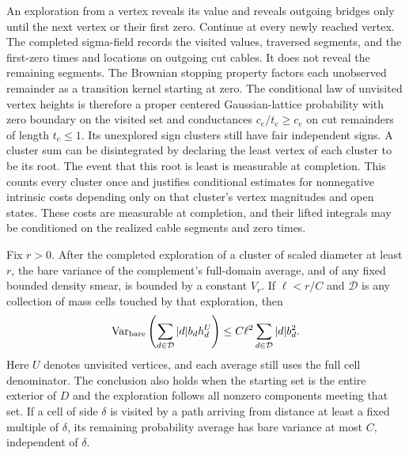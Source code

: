 An exploration from a vertex reveals its value and reveals outgoing
bridges only until the next vertex or their first zero.  Continue at
every newly reached vertex.  The completed sigma-field records the
visited values, traversed segments, and the first-zero times and
locations on outgoing cut cables.  It does not reveal the remaining
segments.  The Brownian stopping property factors each unobserved
remainder as a transition kernel starting at zero.  The conditional
law of unvisited vertex heights is therefore a proper centered
Gaussian-lattice probability with zero boundary on the visited set
and conductances $c_e/t_e\ge c_e$ on cut remainders of length
$t_e\le1$.  Its unexplored sign clusters still have fair independent
signs.  A cluster sum can be disintegrated by declaring the least
vertex of each cluster to be its root.  The event that this root is
least is measurable at completion.  This counts every cluster once
and justifies conditional estimates for nonnegative intrinsic costs
depending only on that cluster's vertex magnitudes and open states.
These costs are measurable at completion, and their lifted integrals
may be conditioned on the realized cable segments and zero times.

\begin{lemma}\label{an:path-poincare}
Fix $r>0$.  After the completed exploration of a cluster of scaled
diameter at least $r$, the bare variance of the complement's
full-domain average, and of any fixed bounded density smear, is
bounded by a constant $V_r$.  If $\ell<r/C$ and $\mathcal D$ is any
collection of mass cells touched by that exploration, then
\begin{equation}
 \operatorname{Var}_{\mathrm{bare}}\left(
       \sum_{d\in\mathcal D}|d|b_d h_d^U\right)
    \le C\ell^2\sum_{d\in\mathcal D}|d|b_d^2.
 \label{an:local-path-bound}
\end{equation}
Here $U$ denotes unvisited vertices, and each average still uses the
full cell denominator.  The conclusion also holds when the starting
set is the entire exterior of $D$ and the exploration follows all
nonzero components meeting that set.  If a cell of side $\delta$ is
visited by a path arriving from distance at least a fixed multiple
of $\delta$, its remaining probability average has bare variance at
most $C$, independent of $\delta$.
\end{lemma}


